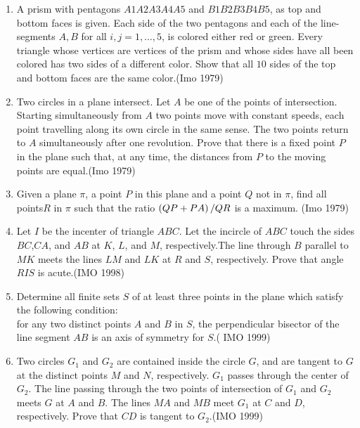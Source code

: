 \begin{enumerate}
\item A prism with pentagons $A1 A2 A3 A4 A5$ and $B1 B2 B3 B4 B5$, as top and bottom faces is given. Each side of the two pentagons and each of the line- segments $A,B$ for all $i, j = 1,\ldots,5$, is colored either red or green. Every triangle whose vertices are vertices of the prism and whose sides have all been colored has two sides of a different color. Show that all $10$ sides of the top and bottom faces are the same color.\hfill(Imo 1979) 
\item Two circles in a plane intersect. Let $A$ be one of the points of intersection. Starting simultaneously from $A$ two points move with constant speeds, each point travelling along its own circle in the same sense. The two points return to $A$ simultaneously after one revolution. Prove that there is a fixed point $P$ in the plane such that, at any time, the distances from $P$ to the moving points are equal.\hfill(Imo 1979) 
\item Given a plane $\pi$, a point $P$ in this plane and a point $Q$ not in $\pi$, find all points$R$ in $\pi$ such that the ratio $\left(QP+PA\right)/Q R$ is a maximum. \hfill(Imo 1979)
\item Let $I$ be the incenter of triangle $ABC$. Let the incircle of $ABC$ touch the sides $BC$,$CA$, and $AB$ at $K$, $L$, and $M$, respectively.The line through $B$ parallel to $MK$ meets the lines $LM$ and $LK$ at $R$ and $S$, respectively. Prove that angle $RIS$ is acute.\hfill(IMO 1998)

\item Determine all finite sets $S$ of at least three points in the plane which satisfy the following condition:\\for any two distinct points $A$ and $B$ in $S$, the perpendicular bisector of the line segment $AB$ is an axis of symmetry for $S$.\hfill( IMO 1999)

\item Two circles ${G_{1}}$ and ${G_{2}}$ are contained inside the circle $G$, and are tangent to $G$ at the distinct points $M$ and $N$, respectively. ${G_{1}}$ passes through the center of ${G_{2}}$. The line passing through the two points of intersection of ${G_{1}}$ and ${G_{2}}$ meets $G$ at $A$ and $B$. The lines $MA$ and $MB$ meet ${G_{1}}$ at $C$ and $D$, respectively. Prove that $CD$ is tangent to ${G_{2}}$.\hfill(IMO 1999)
                      	

\end{enumerate}
